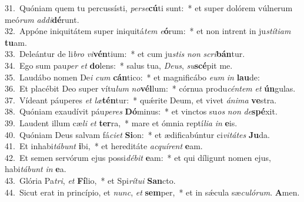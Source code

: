 {31.~}Quóniam quem tu percussísti, \textit{per}\textit{se}\textbf{cú}ti sunt:~* et super dolórem vúlnerum meó\textit{rum} \textit{ad}\textit{di}\textbf{dé}runt.\\
{32.~}Appóne iniquitátem super iniquitá\textit{tem} \textit{e}\textbf{ó}rum:~* et non intrent in ju\textit{stí}\textit{ti}\textit{am} \textbf{tu}am.\\
{33.~}Deleántur de li\textit{bro} \textit{vi}\textbf{vén}tium:~* et cum ju\textit{stis} \textit{non} \textit{scri}\textbf{bán}tur.\\
{34.~}Ego sum pau\textit{per} \textit{et} \textbf{do}lens:~* salus tua, \textit{De}\textit{us}, \textit{su}\textbf{scé}pit me.\\
{35.~}Laudábo nomen De\textit{i} \textit{cum} \textbf{cán}tico:~* et magnificábo \textit{e}\textit{um} \textit{in} \textbf{lau}de:\\
{36.~}Et placébit Deo super vítu\textit{lum} \textit{no}\textbf{vél}lum:~* córnua produ\textit{cén}\textit{tem} \textit{et} \textbf{ún}gulas.\\
{37.~}Vídeant páuperes \textit{et} \textit{læ}\textbf{tén}tur:~* quǽrite Deum, et vivet \textit{á}\textit{ni}\textit{ma} \textbf{ve}stra.\\
{38.~}Quóniam exaudívit páu\textit{pe}\textit{res} \textbf{Dó}minus:~* et vinctos su\textit{os} \textit{non} \textit{de}\textbf{spé}xit.\\
{39.~}Laudent illum cæ\textit{li} \textit{et} \textbf{ter}ra,~* mare et ómnia reptí\textit{li}\textit{a} \textit{in} \textbf{e}is.\\
{40.~}Quóniam Deus salvam fá\textit{ci}\textit{et} \textbf{Si}on:~* et ædificabúntur ci\textit{vi}\textit{tá}\textit{tes} \textbf{Ju}da.\\
{41.~}Et inhabi\textit{tá}\textit{bunt} \textbf{i}bi,~* et hereditáte \textit{ac}\textit{quí}\textit{rent} \textbf{e}am.\\
{42.~}Et semen servórum ejus possi\textit{dé}\textit{bit} \textbf{e}am:~* et qui díligunt nomen ejus, habi\textit{tá}\textit{bunt} \textit{in} \textbf{e}a.\\
{43.~}Glória Pa\textit{tri}, \textit{et} \textbf{Fí}lio,~* et Spi\textit{rí}\textit{tu}\textit{i} \textbf{San}cto.\\
{44.~}Sicut erat in princípio, et \textit{nunc}, \textit{et} \textbf{sem}per,~* et in sǽcula sæ\textit{cu}\textit{ló}\textit{rum}. \textbf{A}men.\\
